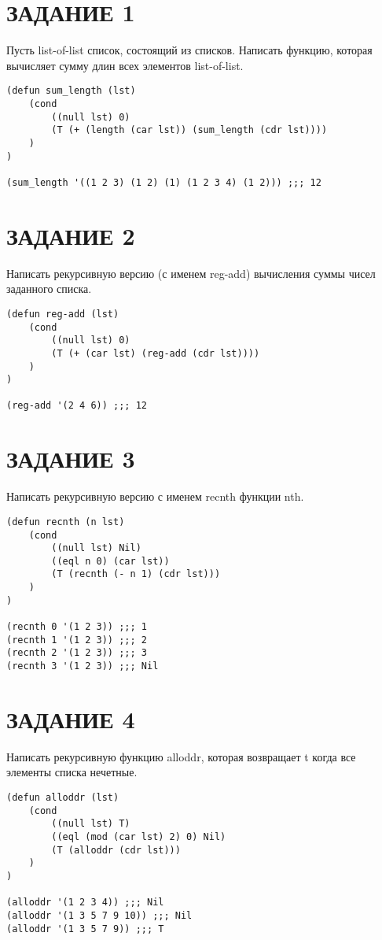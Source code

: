 \section{ЗАДАНИЕ 1}

Пусть list-of-list список, состоящий из списков.
Написать функцию, которая вычисляет сумму длин всех элементов
list-of-list.

\begin{lstlisting}
(defun sum_length (lst)
    (cond
        ((null lst) 0)
        (T (+ (length (car lst)) (sum_length (cdr lst))))
    )
)

(sum_length '((1 2 3) (1 2) (1) (1 2 3 4) (1 2))) ;;; 12
\end{lstlisting}

\section{ЗАДАНИЕ 2}

Написать рекурсивную версию (с именем reg-add) вычисления суммы чисел
заданного списка.

\begin{lstlisting}
(defun reg-add (lst)
    (cond
        ((null lst) 0)
        (T (+ (car lst) (reg-add (cdr lst))))
    )
)

(reg-add '(2 4 6)) ;;; 12
\end{lstlisting}

\section{ЗАДАНИЕ 3}

Написать рекурсивную версию с именем recnth функции nth.

\begin{lstlisting}
(defun recnth (n lst)
    (cond
        ((null lst) Nil)
        ((eql n 0) (car lst))
        (T (recnth (- n 1) (cdr lst)))
    )
)

(recnth 0 '(1 2 3)) ;;; 1
(recnth 1 '(1 2 3)) ;;; 2
(recnth 2 '(1 2 3)) ;;; 3
(recnth 3 '(1 2 3)) ;;; Nil
\end{lstlisting}

\section{ЗАДАНИЕ 4}

Написать рекурсивную функцию alloddr, которая возвращает t когда все
элементы списка нечетные.

\begin{lstlisting}
(defun alloddr (lst)
    (cond
        ((null lst) T)
        ((eql (mod (car lst) 2) 0) Nil)
        (T (alloddr (cdr lst)))
    )
)

(alloddr '(1 2 3 4)) ;;; Nil
(alloddr '(1 3 5 7 9 10)) ;;; Nil
(alloddr '(1 3 5 7 9)) ;;; T
\end{lstlisting}

